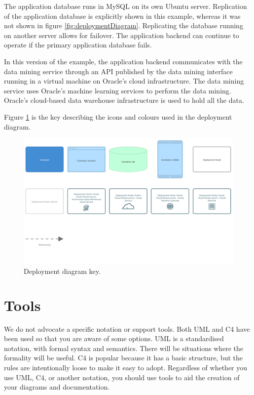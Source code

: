 The application database runs in MySQL on its own Ubuntu server.
Replication of the application database is explicitly shown in this example, whereas it was not shown in figure \ref{fig:deploymentDiagram}.
Replicating the database running on another server allows for failover.
The application backend can continue to operate if the primary application database fails.

In this version of the example, the application backend communicates with the data mining service
through an API published by the data mining interface running in a virtual machine on Oracle's cloud infrastructure.
The data mining service uses Oracle's machine learning services to perform the data mining.
Oracle's cloud-based data warehouse infrastructure is used to hold all the data.

\noindent
Figure \ref{fig:c4_deployment_key} is the key describing the icons and colours used in the deployment diagram.

\begin{figure}[h!]
    \centering
    \begin{adjustwidth}{-7.5mm}{-7.5mm}
        \includegraphics[trim=22 210 22 24,clip,width=0.95\paperwidth]{images/c4/deployment_diagram-key.png}
    \end{adjustwidth}
    \caption{Deployment diagram key.}
    \label{fig:c4_deployment_key}
\end{figure}

\section{Tools}
We do not advocate a specific notation or support tools.
Both UML and C4 have been used so that you are aware of some options.
UML is a standardised notation, with formal syntax and semantics.
There will be situations where the formality will be useful.
C4 is popular because it has a basic structure, but the rules are intentionally loose to make it easy to adopt.
Regardless of whether you use UML, C4, or another notation, you should use tools to aid the creation of your diagrams and documentation.

